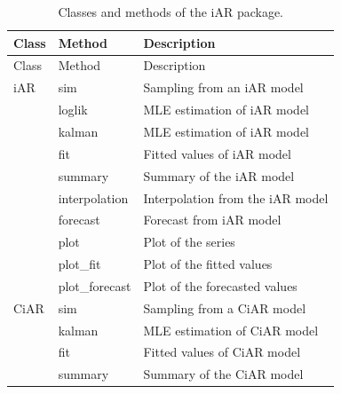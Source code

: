 \begin{longtable}[]{@{}
  >{\raggedright\arraybackslash}p{}
  >{\raggedright\arraybackslash}p{}
  >{\raggedright\arraybackslash}p{}@{}}
\caption{\label{tab:coreR} Classes and methods of the iAR package.}\tabularnewline
\toprule\noalign{}
\begin{minipage}[b]{\linewidth}\raggedright
Class
\end{minipage} & \begin{minipage}[b]{\linewidth}\raggedright
Method
\end{minipage} & \begin{minipage}[b]{\linewidth}\raggedright
Description
\end{minipage} \\
\midrule\noalign{}
\endfirsthead
\toprule\noalign{}
\begin{minipage}[b]{\linewidth}\raggedright
Class
\end{minipage} & \begin{minipage}[b]{\linewidth}\raggedright
Method
\end{minipage} & \begin{minipage}[b]{\linewidth}\raggedright
Description
\end{minipage} \\
\midrule\noalign{}
\endhead
\bottomrule\noalign{}
\endlastfoot
iAR & sim & Sampling from an iAR model \\
& loglik & MLE estimation of iAR model \\
& kalman & MLE estimation of iAR model \\
& fit & Fitted values of iAR model \\
& summary & Summary of the iAR model \\
& interpolation & Interpolation from the iAR model \\
& forecast & Forecast from iAR model \\
& plot & Plot of the series \\
& plot\_fit & Plot of the fitted values \\
& plot\_forecast & Plot of the forecasted values \\
CiAR & sim & Sampling from a CiAR model \\
& kalman & MLE estimation of CiAR model \\
& fit & Fitted values of CiAR model \\
& summary & Summary of the CiAR model \\

\end{longtable}
